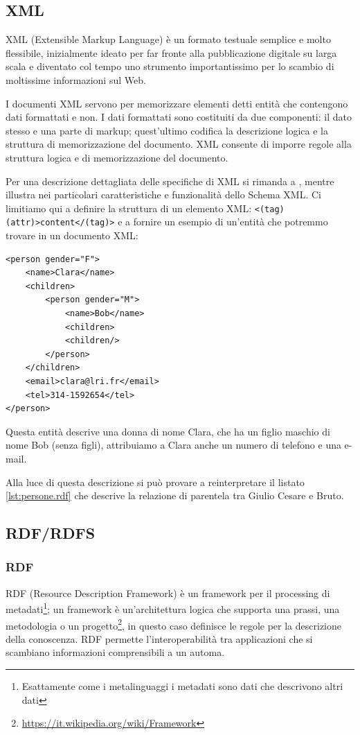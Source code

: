 \subsection{XML}
XML (Extensible Markup Language) è un formato testuale semplice e molto flessibile, inizialmente ideato per far fronte alla pubblicazione digitale su larga scala e diventato col tempo uno strumento importantissimo per lo scambio di moltissime informazioni sul Web\cite{w3cXml}.

I documenti XML servono per memorizzare elementi detti entità che contengono dati formattati e non. I dati formattati sono costituiti da due componenti: il dato stesso e una parte di markup; quest'ultimo codifica la descrizione logica e la struttura di memorizzazione del documento. XML consente di imporre regole alla struttura logica e di memorizzazione del documento\cite{world2006extensible}.

Per una descrizione dettagliata delle specifiche di XML si rimanda a \cite{world2006extensible}, mentre \cite{li2005testing} illustra nei particolari caratteristiche e funzionalità dello Schema XML. Ci limitiamo qui a definire la struttura di un elemento XML: \verb|<(tag) (attr)>content</(tag)>| e a fornire un esempio di un'entità che potremmo trovare in un documento XML:
\begin{verbatim}
<person gender="F">
	<name>Clara</name>
	<children>
		<person gender="M">
			<name>Bob</name>
			<children>
			<children/>
		</person>
	</children>
	<email>clara@lri.fr</email>
	<tel>314-1592654</tel>
</person>
\end{verbatim}
Questa entità descrive una donna di nome Clara, che ha un figlio maschio di nome Bob (senza figli), attribuiamo a Clara anche un numero di telefono e una e-mail.

Alla luce di questa descrizione si può provare a reinterpretare il listato \ref{lst:persone.rdf} che descrive la relazione di parentela tra Giulio Cesare e Bruto.
\subsection{RDF/RDFS}
\subsubsection{RDF}
RDF (Resource Description Framework) è un framework per il processing di metadati\footnote{Esattamente come i metalinguaggi i metadati sono dati che descrivono altri dati}; un framework è un'architettura logica che supporta una prassi, una metodologia o un progetto\footnote{\url{https://it.wikipedia.org/wiki/Framework}}, in questo caso definisce le regole per la descrizione della conoscenza. RDF permette l'interoperabilità tra applicazioni che si scambiano informazioni comprensibili a un automa.

